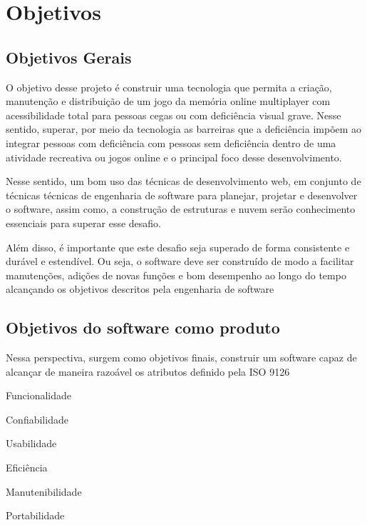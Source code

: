 \chapter{Objetivos}

\label{chap:Objetivos}

\section{Objetivos Gerais}
O objetivo desse projeto é construir uma tecnologia que permita a criação, manutenção e distribuição de um jogo da memória online multiplayer com acessibilidade total para pessoas cegas ou com deficiência visual grave. Nesse sentido, superar, por meio da tecnologia as barreiras que a deficiência impõem ao integrar pessoas com deficiência com pessoas sem deficiência dentro de uma atividade recreativa ou jogos online e o principal foco desse desenvolvimento.

Nesse sentido, um bom uso das técnicas de desenvolvimento web, em conjunto de técnicas técnicas de engenharia de software para planejar, projetar e desenvolver o software, assim como, a construção de estruturas e nuvem serão conhecimento essenciais para superar esse desafio.

Além disso, é importante que este desafio seja superado de forma consistente e durável e estendível. Ou seja, o software deve ser construído de modo a facilitar manutenções, adições de novas funções e bom desempenho ao longo do tempo alcançando os objetivos descritos pela engenharia de software

\section{Objetivos do software como produto}

Nessa perspectiva, surgem como objetivos finais, construir um software capaz de alcançar de maneira razoável os atributos definido pela ISO 9126 \cite{ISOIEC9157:online}

\begin{alineascomponto}
  \item Funcionalidade
  \item Confiabilidade
  \item Usabilidade
  \item Eficiência
  \item Manutenibilidade
  \item Portabilidade
\end{alineascomponto}
